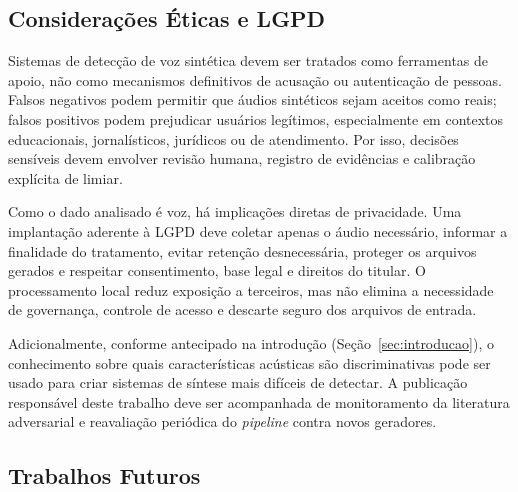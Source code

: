 \documentclass[12pt,a4paper]{article}
\begin{document}
\subsection{Considerações Éticas e LGPD}
\label{sec:etica_lgpd}

Sistemas de detecção de voz sintética devem ser tratados como ferramentas de
apoio, não como mecanismos definitivos de acusação ou autenticação de pessoas.
Falsos negativos podem permitir que áudios sintéticos sejam aceitos como reais;
falsos positivos podem prejudicar usuários legítimos, especialmente em
contextos educacionais, jornalísticos, jurídicos ou de atendimento. Por isso,
decisões sensíveis devem envolver revisão humana, registro de evidências e
calibração explícita de limiar.

Como o dado analisado é voz, há implicações diretas de privacidade. Uma
implantação aderente à LGPD deve coletar apenas o áudio necessário, informar a
finalidade do tratamento, evitar retenção desnecessária, proteger os arquivos
gerados e respeitar consentimento, base legal e direitos do titular. O
processamento local reduz exposição a terceiros, mas não elimina a necessidade
de governança, controle de acesso e descarte seguro dos arquivos de entrada.

Adicionalmente, conforme antecipado na introdução (Seção~\ref{sec:introducao}),
o conhecimento sobre quais características acústicas são discriminativas pode
ser usado para criar sistemas de síntese mais difíceis de detectar. A
publicação responsável deste trabalho deve ser acompanhada de monitoramento
da literatura adversarial e reavaliação periódica do \textit{pipeline} contra novos
geradores.

\subsection{Trabalhos Futuros}
\label{sec:trabalhos_futuros}
\end{document}
